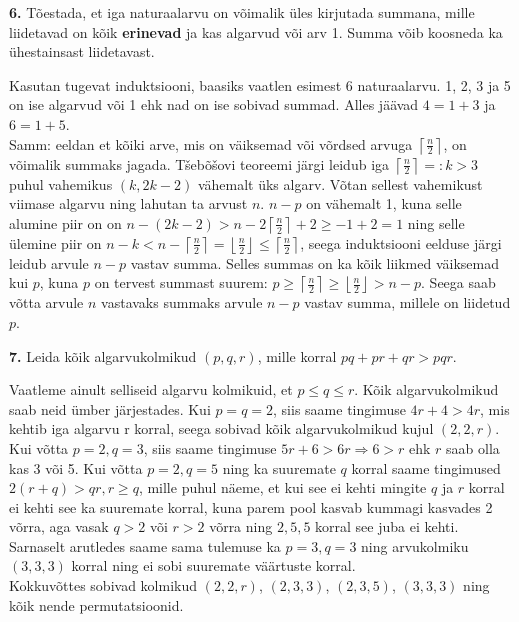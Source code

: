\documentclass[a4paper, 10pt]{article}
\begin{document}
\bigskip
\pagebreak
\noindent \textbf{6.} Tõestada, et iga naturaalarvu on võimalik üles kirjutada summana, mille liidetavad on kõik {\bf erinevad} ja kas algarvud või arv 1. Summa võib koosneda ka ühestainsast liidetavast. 

\bigskip

Kasutan tugevat induktsiooni, baasiks vaatlen esimest 6 naturaalarvu. 1, 2, 3 ja 5 on ise algarvud või 1 ehk nad on ise sobivad summad. Alles jäävad $4=1+3$ ja $6=1+5$.\\
Samm: eeldan et kõiki arve, mis on väiksemad  või võrdsed arvuga $\left\lceil \frac n2\right\rceil$, on võimalik summaks jagada. Tšebõšovi teoreemi järgi leidub iga $\left\lceil \frac n2\right\rceil=:k>3$ puhul vahemikus $(k,2k-2)$ vähemalt üks algarv. Võtan sellest vahemikust viimase algarvu ning lahutan ta arvust $n$. $n-p$ on vähemalt 1, kuna selle alumine piir on on $n-(2k-2)>n-2\left\lceil \frac n2\right\rceil+2\geq-1+2=1$ ning selle ülemine piir on $n-k<n-\left\lceil \frac n2\right\rceil= \left\lfloor \frac n2\right\rfloor\leq\left\lceil \frac n2\right\rceil$, seega induktsiooni eelduse järgi leidub arvule $n-p$ vastav summa. Selles summas on ka kõik liikmed väiksemad kui $p$, kuna $p$ on tervest summast suurem: $p\geq\left\lceil \frac n2\right\rceil\geq\left\lfloor \frac n2\right\rfloor> n-p$. Seega saab võtta arvule $n$ vastavaks summaks arvule $n-p$ vastav summa, millele on liidetud $p$.

\bigskip

\noindent \textbf{7.} Leida kõik algarvukolmikud $(p,q,r)$, mille korral $pq + pr + qr > pqr$.

\bigskip

Vaatleme ainult selliseid algarvu kolmikuid, et $p\leq q\leq r$. Kõik algarvukolmikud saab neid ümber järjestades. Kui $p=q=2$, siis saame tingimuse $4r+4>4r$, mis kehtib iga algarvu r korral, seega sobivad kõik algarvukolmikud kujul $(2,2,r)$. Kui võtta $p=2,q=3$, siis saame tingimuse $5r+6>6r\Rightarrow 6>r$ ehk $r$ saab olla kas 3 või 5. Kui võtta $p=2,q=5$ ning ka suuremate $q$ korral saame tingimused $2(r+q)>qr,r\geq q$, mille puhul näeme, et kui see ei kehti mingite $q$ ja $r$ korral ei kehti see ka suuremate korral, kuna parem pool kasvab kummagi kasvades 2 võrra, aga vasak $q>2$ või $r>2$ võrra ning $2,5,5$ korral see juba ei kehti. Sarnaselt arutledes saame sama tulemuse ka $p=3,q=3$ ning arvukolmiku $(3,3,3)$ korral ning ei sobi suuremate väärtuste korral.\\
Kokkuvõttes sobivad kolmikud $(2,2,r)$, $(2,3,3)$, $(2,3,5)$, $(3,3,3)$ ning kõik nende permutatsioonid.
\end{document}
